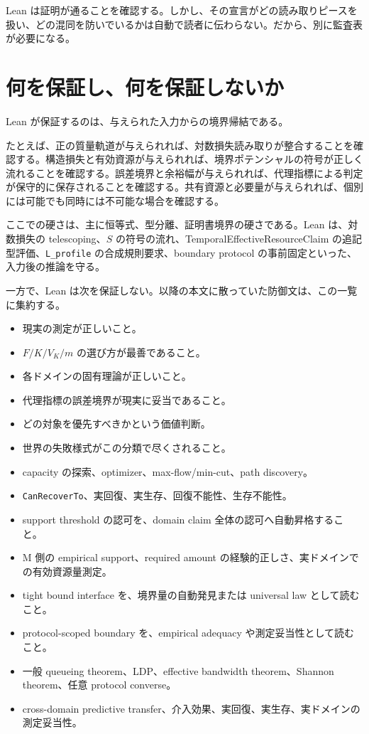 \documentclass[12pt,a4paper]{article}
\begin{document}
Lean は証明が通ることを確認する。しかし、その宣言がどの読み取りピースを扱い、どの混同を防いでいるかは自動で読者に伝わらない。だから、別に監査表が必要になる。

\section{何を保証し、何を保証しないか}\label{ux4f55ux3092ux4fddux8a3cux3057ux4f55ux3092ux4fddux8a3cux3057ux306aux3044ux304b}

Lean が保証するのは、与えられた入力からの境界帰結である。

たとえば、正の質量軌道が与えられれば、対数損失読み取りが整合することを確認する。構造損失と有効資源が与えられれば、境界ポテンシャルの符号が正しく流れることを確認する。誤差境界と余裕幅が与えられれば、代理指標による判定が保守的に保存されることを確認する。共有資源と必要量が与えられれば、個別には可能でも同時には不可能な場合を確認する。

ここでの硬さは、主に恒等式、型分離、証明書境界の硬さである。Lean は、対数損失の telescoping、\(S\) の符号の流れ、TemporalEffectiveResourceClaim の追記型評価、\texttt{L\_profile} の合成規則要求、boundary protocol の事前固定といった、入力後の推論を守る。

一方で、Lean は次を保証しない。以降の本文に散っていた防御文は、この一覧に集約する。

\begin{itemize}
\tightlist
\item
  現実の測定が正しいこと。
\item
  \(F/K/V_K/m\) の選び方が最善であること。
\item
  各ドメインの固有理論が正しいこと。
\item
  代理指標の誤差境界が現実に妥当であること。
\item
  どの対象を優先すべきかという価値判断。
\item
  世界の失敗様式がこの分類で尽くされること。
\item
  capacity の探索、optimizer、max-flow/min-cut、path discovery。
\item
  \texttt{CanRecoverTo}、実回復、実生存、回復不能性、生存不能性。
\item
  support threshold の認可を、domain claim 全体の認可へ自動昇格すること。
\item
  M 側の empirical support、required amount の経験的正しさ、実ドメインでの有効資源量測定。
\item
  tight bound interface を、境界量の自動発見または universal law として読むこと。
\item
  protocol-scoped boundary を、empirical adequacy や測定妥当性として読むこと。
\item
  一般 queueing theorem、LDP、effective bandwidth theorem、Shannon theorem、任意 protocol converse。
\item
  cross-domain predictive transfer、介入効果、実回復、実生存、実ドメインの測定妥当性。
\end{itemize}
\end{document}
